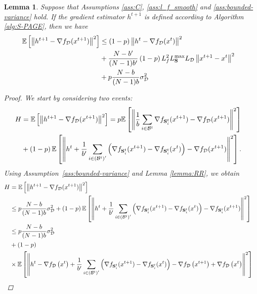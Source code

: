 \documentclass{article}
\newtheorem{lemma}{Lemma}
\theoremstyle{plain}
\newcommand{\tf}{f_{\mathcal{D}}}
\newcommand{\mS}{{\bf S}}
\theoremstyle{plain}
\theoremstyle{definition}
\theoremstyle{remark}
\begin{document}
\begin{lemma}
Suppose that Assumptions \ref{ass:C}, \ref{ass:l_f_smooth} and \ref{ass:bounded-variance} hold. If the gradient estimator $h^{t+1}$ is defined according to Algorithm \ref{alg:S-PAGE}, then we have
  \begin{align*}
\mathbb{E}\left[\left\|h^{t+1}-\nabla \tf(x^{t+1})\right\|^2\right] &\leq\left(1-p\right)\left\|h^t-\nabla \tf(x^t)\right\|^2\\&+\frac{N-b^{\prime}}{(N-1)b^{\prime}}\left(1-p\right) L_f^2 L^{\max}_{\mS} L_{\mathcal{D}}\left\|x^{t+1}-x^t\right\|^2\\
&+ p\frac{N-b}{(N-1)b} \sigma^2_{\mathcal{D}}
  \end{align*}


\begin{proof}
We start by considering two events:
   \begin{align*}
         H &=   \mathbb{E}\left[\left\|h^{t+1}-\nabla \tf(x^{t+1})\right\|^2\right] =  p \mathbb{E}\left[\left\|\frac{1}{b}\sum \limits_{i \in \mathcal{B}^{t}}\nabla f_{\mS^t_i}(x^{t+1})-\nabla \tf(x^{t+1})\right\|^2\right]\\
           &+\left(1-p\right) \mathbb{E}\left[\left\|h^t+\frac{1}{b^{\prime}} \sum \limits_{i \in \left(\mathcal{B}^{t}\right)^\prime}\left( \nabla f_{\mS^t_i}(x^{t+1})-\nabla f_{\mS^t_i}(x^{t})\right)-\nabla \tf(x^{t+1})\right\|^2\right].
   \end{align*}
   Using Assumption~\ref{ass:bounded-variance} and Lemma \ref{lemma:RR}, we obtain
   \begin{equation*}
   \begin{split}
           H &=   \mathbb{E}\left[\left\|h^{t+1}-\nabla \tf(x^{t+1})\right\|^2\right]\\
           &\leq   p\frac{N-b}{(N-1)b} \sigma^2_{\mathcal{D}} +\left(1-p\right) \mathbb{E}\left[\left\|h^t+\frac{1}{b^{\prime}} \sum_{i \in \left(\mathcal{B}^{t}\right)^\prime}\left(\nabla f_{\mS^t_i}(x^{t+1})-\nabla f_{\mS^t_i}(x^{t})\right)-\nabla f_{\mS^t_i}(x^{t+1})\right\|^2\right]\\
              &\leq p\frac{N-b}{(N-1)b} \sigma^2_{\mathcal{D}}\\
              &+ \left(1-p\right) \\
              & \times\mathbb{E}\left[\left\|h^t-\nabla f_{\mathcal{D}}\left(x^t\right)+\frac{1}{b^{\prime}} \sum_{i \in \left(\mathcal{B}^{t}\right)^\prime}\left(\nabla f_{\mS^t_i}(x^{t+1})-\nabla f_{\mS^t_i}(x^{t})\right)-\nabla f_{\mathcal{D}}\left(x^{t+1}\right)+\nabla f_{\mathcal{D}}\left(x^t\right)\right\|^2\right]\\

\end{split}
\end{equation*}
\end{proof}
\end{lemma}
\end{document}
